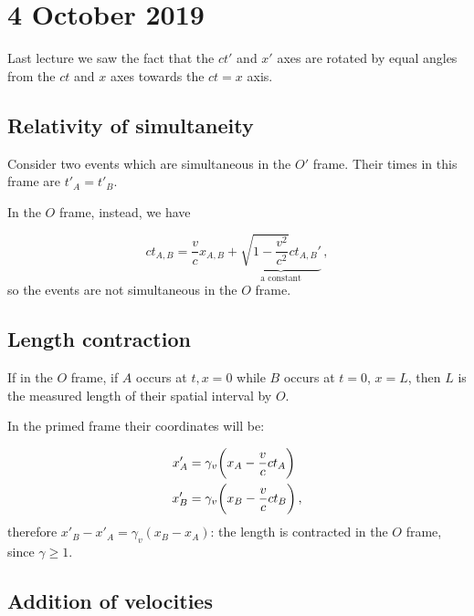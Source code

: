 \documentclass[main.tex]{subfiles}
\begin{document}
\section*{4 October 2019}

Last lecture we saw the fact that the \(ct'\) and \(x'\) axes are rotated by equal angles from the \(ct\) and \(x\) axes towards the \(ct=x\) axis.

\subsection{Relativity of simultaneity}

Consider two events which are simultaneous in the \(O'\) frame. Their times in this frame are \(t'_A = t'_B\).

In the \(O\) frame, instead, we have

\begin{equation}
ct_{A, B} = \frac{v}{c} x_{A, B} + \underbrace{\sqrt{1- \frac{v^2}{c^2} } c t_{A, B}'}_{\text{a constant}}\,,
\end{equation}
%
so the events are not simultaneous in the \(O\) frame.

\subsection{Length contraction}

If in the \(O\) frame, if \(A\) occurs at \(t, x = 0\) while \(B\) occurs at \(t=0\), \(x=L\), then \(L\) is the measured length of their spatial interval by \(O\).

In the primed frame their coordinates will be:

\begin{subequations}
\begin{align}
  x'_A &= \gamma_v \qty(x_A - \frac{v}{c} c t_A) \\
  x'_B &= \gamma_v \qty(x_B - \frac{v}{c} c t_B) \,,
\end{align}
\end{subequations}
%
therefore \(x'_B - x'_A = \gamma_v (x_B - x_A)\): the length is contracted in the \(O\) frame, since \(\gamma\geq 1\).


\subsection{Addition of velocities}
\end{document}
